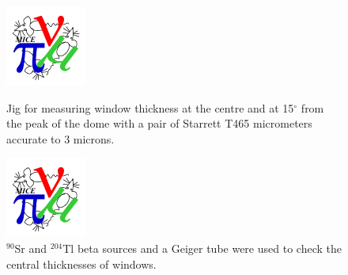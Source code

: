 \begin{figure}
  \begin{minipage}{0.46\textwidth}
    \centerline{\includegraphics*[height=0.73\linewidth]{micrometer2}}
    \caption{
      Jig for measuring window thickness at the centre and at 15$^{\circ}$
      from the peak of the dome with a pair of
      Starrett T465 micrometers accurate to 3 microns.
    } 
    \label{micrometers}
  \end{minipage}\hfill%
  \begin{minipage}{0.46\textwidth}
    \centerline{\includegraphics*[height=0.73\linewidth]{Beta_window2}}
    \caption{
      $^{90}$Sr and $^{204}$Tl beta sources and a Geiger tube were used to
      check the central thicknesses of windows.
    }
    \label{beta_rays}
  \end{minipage}
\end{figure}
